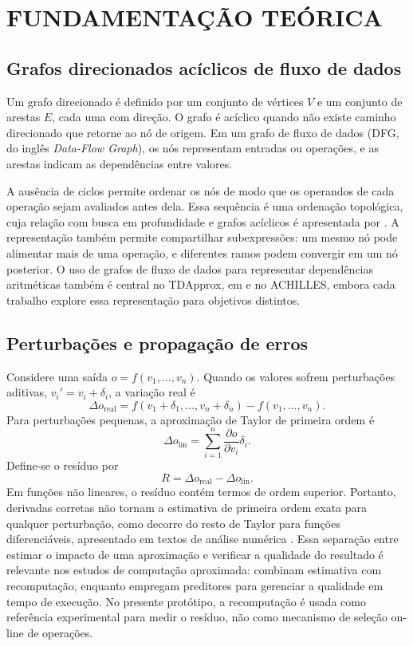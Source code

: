 \documentclass[12pt,openright,oneside,a4paper,brazil]{abntex2}
\begin{document}
\chapter{FUNDAMENTAÇÃO TEÓRICA}

\section{Grafos direcionados acíclicos de fluxo de dados}
Um grafo direcionado é definido por um conjunto de vértices $V$ e um conjunto de arestas $E$, cada uma com direção. O grafo é acíclico quando não existe caminho direcionado que retorne ao nó de origem. Em um grafo de fluxo de dados (DFG, do inglês \textit{Data-Flow Graph}), os nós representam entradas ou operações, e as arestas indicam as dependências entre valores.

A ausência de ciclos permite ordenar os nós de modo que os operandos de cada operação sejam avaliados antes dela. Essa sequência é uma ordenação topológica, cuja relação com busca em profundidade e grafos acíclicos é apresentada por . A representação também permite compartilhar subexpressões: um mesmo nó pode alimentar mais de uma operação, e diferentes ramos podem convergir em um nó posterior. O uso de grafos de fluxo de dados para representar dependências aritméticas também é central no TDApprox, em  e no ACHILLES, embora cada trabalho explore essa representação para objetivos distintos.

\section{Perturbações e propagação de erros}
Considere uma saída $o=f(v_1,\ldots,v_n)$. Quando os valores sofrem perturbações aditivas, $v_i'=v_i+\delta_i$, a variação real é
\begin{equation}
\Delta o_{\mathrm{real}}=f(v_1+\delta_1,\ldots,v_n+\delta_n)-f(v_1,\ldots,v_n).
\label{eq:variacao-real}
\end{equation}
Para perturbações pequenas, a aproximação de Taylor de primeira ordem é
\begin{equation}
\Delta o_{\mathrm{lin}}=\sum_{i=1}^{n}\frac{\partial o}{\partial v_i}\delta_i.
\label{eq:variacao-linear}
\end{equation}
Define-se o resíduo por
\begin{equation}
R=\Delta o_{\mathrm{real}}-\Delta o_{\mathrm{lin}}.
\label{eq:residuo}
\end{equation}
Em funções não lineares, o resíduo contém termos de ordem superior. Portanto, derivadas corretas não tornam a estimativa de primeira ordem exata para qualquer perturbação, como decorre do resto de Taylor para funções diferenciáveis, apresentado em textos de análise numérica \cite{burden2016}. Essa separação entre estimar o impacto de uma aproximação e verificar a qualidade do resultado é relevante nos estudos de computação aproximada:  combinam estimativa com recomputação, enquanto  empregam preditores para gerenciar a qualidade em tempo de execução. No presente protótipo, a recomputação é usada como referência experimental para medir o resíduo, não como mecanismo de seleção on-line de operações.
\end{document}
